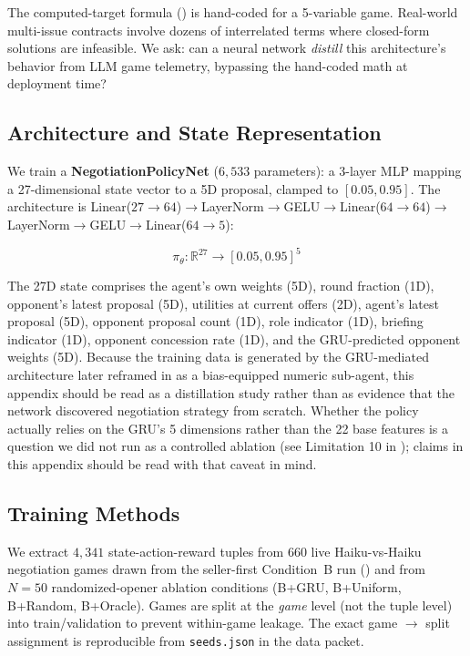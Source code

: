 \documentclass[11pt,a4paper]{article}
\begin{document}
The computed-target formula () is hand-coded for a 5-variable game. Real-world multi-issue contracts involve dozens of interrelated terms where closed-form solutions are infeasible. We ask: can a neural network \emph{distill} this architecture's behavior from LLM game telemetry, bypassing the hand-coded math at deployment time?

\subsection{Architecture and State Representation}

We train a \textbf{NegotiationPolicyNet} ($6{,}533$ parameters): a 3-layer MLP mapping a 27-dimensional state vector to a 5D proposal, clamped to $[0.05, 0.95]$. The architecture is Linear($27\!\to\!64$)$\to$LayerNorm$\to$GELU$\to$Linear($64\!\to\!64$)$\to$LayerNorm$\to$GELU$\to$Linear($64\!\to\!5$):

\begin{equation}
\pi_\theta: \mathbb{R}^{27} \to [0.05, 0.95]^5
\label{eq:policy}
\end{equation}

The 27D state comprises the agent's own weights (5D), round fraction (1D), opponent's latest proposal (5D), utilities at current offers (2D), agent's latest proposal (5D), opponent proposal count (1D), role indicator (1D), briefing indicator (1D), opponent concession rate (1D), and the GRU-predicted opponent weights (5D). Because the training data is generated by the GRU-mediated architecture later reframed in  as a bias-equipped numeric sub-agent, this appendix should be read as a distillation study rather than as evidence that the network discovered negotiation strategy from scratch. Whether the policy actually relies on the GRU's 5 dimensions rather than the 22 base features is a question we did not run as a controlled ablation (see Limitation 10 in ); claims in this appendix should be read with that caveat in mind.

\subsection{Training Methods}

We extract $4{,}341$ state-action-reward tuples from 660 live Haiku-vs-Haiku negotiation games drawn from the seller-first Condition~B run () and from $N\!=\!50$ randomized-opener ablation conditions (B+GRU, B+Uniform, B+Random, B+Oracle). Games are split at the \emph{game} level (not the tuple level) into train/validation to prevent within-game leakage. The exact game $\to$ split assignment is reproducible from \texttt{seeds.json} in the data packet.
\end{document}
